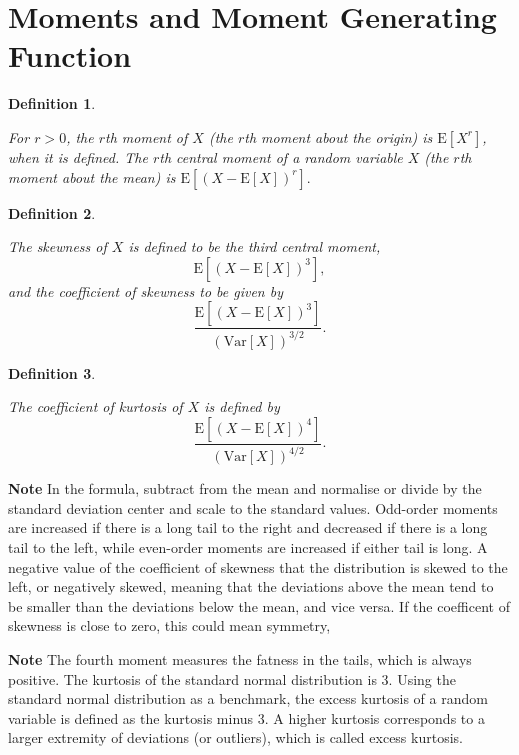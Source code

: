 \documentclass[landscape, 20pt]{extreport}
\theoremstyle{definition}
\newtheorem{definition}{Definition}[chapter]
\theoremstyle{definition}
\theoremstyle{definition}
\theoremstyle{definition}
\theoremstyle{remark}
\begin{document}
\hypertarget{moments-and-moment-generating-function}{%
\section{Moments and Moment Generating Function}\label{moments-and-moment-generating-function}}

\begin{definition}
\protect\hypertarget{def:unlabeled-div-12}{}\label{def:unlabeled-div-12}

\emph{For \(r > 0\), the \(r\)th moment of \(X\) (the \(r\)th
moment about the origin) is \(\mathrm{E}[X^r]\), when it is defined. The
\(r\)th central moment of a random variable \(X\) (the \(r\)th moment about
the mean) is \(\mathrm{E}[(X - \mathrm{E}[X])^r].\) }

\end{definition}

\begin{definition}
\protect\hypertarget{def:unlabeled-div-13}{}\label{def:unlabeled-div-13}

\emph{The skewness of \(X\) is defined to be the third
central moment, \[\mathrm{E}[(X - \mathrm{E}[X])^3],\] and the
coefficient of skewness to be given by
\[\frac{\mathrm{E}[(X - \mathrm{E}[X])^3]}{(\mathrm{Var}[X])^{3/2}}.\] }

\end{definition}

\begin{definition}
\protect\hypertarget{def:unlabeled-div-14}{}\label{def:unlabeled-div-14}

\emph{The coefficient of kurtosis of \(X\) is defined by
\[\frac{\mathrm{E}[(X - \mathrm{E}[X])^4]}{(\mathrm{Var}[X])^{4/2}}.\] }

\end{definition}

\textbf{Note} In the formula, subtract from the mean and normalise or divide by the standard deviation center and scale to the standard values. Odd-order moments are increased if there is a long tail to the right and decreased if there is a long tail to the left, while even-order moments are increased if either tail is long. A negative value of the coefficient of skewness that the distribution is skewed to the left, or negatively skewed, meaning that the deviations above the mean tend to be smaller than the deviations below the mean, and vice versa. If the coefficent of skewness is close to zero, this could mean symmetry,

\textbf{Note} The fourth moment measures the fatness in the tails, which is always positive. The kurtosis of the standard normal distribution is 3. Using the standard normal distribution as a benchmark, the excess kurtosis of a random variable is defined as the kurtosis minus 3. A higher kurtosis corresponds to a larger extremity of deviations (or outliers), which is called excess kurtosis.
\end{document}
